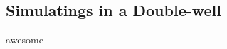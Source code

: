 \begin{figure}
\begin{center}
   \\
  \caption{}
  \label{fig:V_dist_qdots}
 \end{center}
\end{figure}


\subsection{Simulatings in a Double-well}

awesome